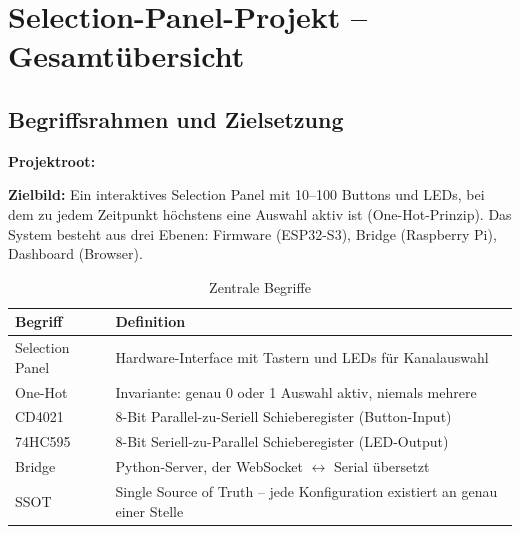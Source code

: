 
\section{Selection-Panel-Projekt -- Gesamtübersicht}
\label{sec:projekt-uebersicht}

\subsection{Begriffsrahmen und Zielsetzung}
\label{subsec:begriffsrahmen}

\textbf{Projektroot:} 

\textbf{Zielbild:} Ein interaktives Selection Panel mit 10--100 Buttons und LEDs,
bei dem zu jedem Zeitpunkt höchstens eine Auswahl aktiv ist (One-Hot-Prinzip).
Das System besteht aus drei Ebenen: Firmware (ESP32-S3), Bridge (Raspberry Pi),
Dashboard (Browser).

\begin{table}[H]
\centering
\caption{Zentrale Begriffe}
\label{tab:projekt-begriffe}
\begin{tabularx}{\textwidth}{@{}l X@{}}
\toprule
\textbf{Begriff} & \textbf{Definition} \\
\midrule
Selection Panel & Hardware-Interface mit Tastern und LEDs für Kanalauswahl \\
One-Hot         & Invariante: genau 0 oder 1 Auswahl aktiv, niemals mehrere \\
CD4021          & 8-Bit Parallel-zu-Seriell Schieberegister (Button-Input) \\
74HC595         & 8-Bit Seriell-zu-Parallel Schieberegister (LED-Output) \\
Bridge          & Python-Server, der WebSocket $\leftrightarrow$ Serial übersetzt \\
SSOT            & Single Source of Truth -- jede Konfiguration existiert an genau einer Stelle \\
\bottomrule
\end{tabularx}
\end{table}

